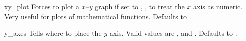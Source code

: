 \begin{AttrDecl}{xy\_plot}
Forces \thisclass to plot a $x$--$y$ graph if set to ,
\ie, to treat the $x$ axis as numeric. Very useful for plots of
mathematical functions. Defaults to .
\end{AttrDecl}

\begin{AttrDecl}{y\_axes}
Tells \thisclass where to place the $y$ axis. Valid values are
,  and . Defaults to
.
\end{AttrDecl}
